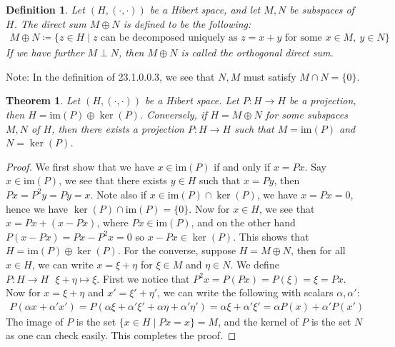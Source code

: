 \documentclass[11pt]{book}
\theoremstyle{break}
\theoremstyle{break}
\newtheorem{thm}{Theorem}[section]
\newtheorem{defn}{Definition}[corL]
\newcommand{\im}{\text{im}}
\newcommand{\note}{\color{red}Note: \color{black}}
\begin{document}
\begin{defn}
Let $(H, (\cdot , \cdot) )$ be a Hibert space, and let $M,N$ be subspaces of $H$. The direct sum $M \oplus N$ is defined to be the following:
\begin{align*}
M \oplus N \coloneqq\{ z \in H \mid z\text{ can be decomposed uniquely as }z = x+y\text{ for some }x\in M, \ y\in N\}
\end{align*}
If we have further $M \perp N$, then $M \oplus N$ is called the orthogonal direct sum.\\
\end{defn}
\note In the definition of 23.1.0.0.3, we see that $N,M$ must satisfy $M \cap N = \{0\}$.\\


\begin{thm}
Let $(H, (\cdot , \cdot) )$ be a Hibert space. Let $P :H \to H$ be a projection, then $H = \im(P) \oplus \ker(P)$. Conversely, if $H = M \oplus N$ for some subspaces $M, N$ of $H$, then there exists a projection $P:H \to H$ such that $M = \im(P)$ and $N = \ker(P)$. 
\end{thm}
\begin{proof}
We first show that we have $x \in \im(P)$ if and only if $x = Px$. Say $x \in \im(P)$, we see that there exists $y \in H$ such that $x=Py$, then $Px = P^2 y = Py = x$. Note also if $x \in \im(P)\cap \ker(P)$, we have $x = Px  = 0$, hence we have $\ker(P) \cap \im(P) = \{0\}$. Now for $x \in H$, we see that $x = Px + (x-Px)$, where $Px \in \im(P)$, and on the other hand $P(x-Px) = Px - P^2 x = 0$ so $x-Px\in \ker(P)$. This shows that $H = \im(P) \oplus \ker(P)$. For the converse, suppose $H = M \oplus N$, then for all $x \in H$, we can write $x = \xi + \eta$ for $\xi \in M$ and $\eta \in N$. We define $P : H \to H \ \ \ \xi + \eta\mapsto \xi$. First we notice that $P^2 x = P(Px) = P(\xi) = \xi = Px$. Now for $x  = \xi +\eta$ and $x' = \xi' + \eta'$, we can write the following with scalars $\alpha,\alpha'$:
\begin{align*}
P(\alpha x + \alpha' x') = P(\alpha \xi + \alpha' \xi' + \alpha \eta + \alpha' \eta') = \alpha \xi + \alpha' \xi' = \alpha P(x)+ \alpha' P(x') 
\end{align*}
The image of $P$ is the set $\{x \in H \mid Px = x\} = M$, and the kernel of $P$ is the set $N$ as one can check easily. This completes the proof. 
\end{proof}
\end{document}
